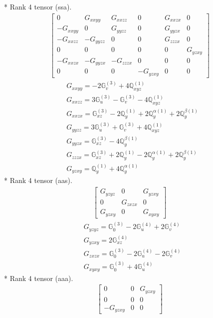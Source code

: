 \documentclass[fleqn,8pt,landscape]{jsarticle}
\begin{document}
* Rank 4 tensor (ssa).
\begin{align*}
\begin{bmatrix} 0 & G_{xxyy} & G_{xxzz} & 0 & G_{xxzx} & 0 \\ - G_{xxyy} & 0 & G_{yyzz} & 0 & G_{yyzx} & 0 \\ - G_{xxzz} & - G_{yyzz} & 0 & 0 & G_{zzzx} & 0 \\ 0 & 0 & 0 & 0 & 0 & G_{yzxy} \\ - G_{xxzx} & - G_{yyzx} & - G_{zzzx} & 0 & 0 & 0 \\ 0 & 0 & 0 & - G_{yzxy} & 0 & 0 \end{bmatrix}
\end{align*}
\begin{align*}
& G_{xxyy} = - 2 \mathbb{G}_{v}^{(3)} + 4 \mathbb{Q}_{xyz}^{(1)} \\
& G_{xxzz} = 3 \mathbb{G}_{u}^{(3)} - \mathbb{G}_{v}^{(3)} - 4 \mathbb{Q}_{xyz}^{(1)} \\
& G_{xxzx} = \mathbb{G}_{xz}^{(3)} - 2 \mathbb{Q}_{y}^{(1)} + 2 \mathbb{Q}_{y}^{\alpha(1)} + 2 \mathbb{Q}_{y}^{\beta(1)} \\
& G_{yyzz} = 3 \mathbb{G}_{u}^{(3)} + \mathbb{G}_{v}^{(3)} + 4 \mathbb{Q}_{xyz}^{(1)} \\
& G_{yyzx} = \mathbb{G}_{xz}^{(3)} - 4 \mathbb{Q}_{y}^{\beta(1)} \\
& G_{zzzx} = \mathbb{G}_{xz}^{(3)} + 2 \mathbb{Q}_{y}^{(1)} - 2 \mathbb{Q}_{y}^{\alpha(1)} + 2 \mathbb{Q}_{y}^{\beta(1)} \\
& G_{yzxy} = \mathbb{Q}_{y}^{(1)} + 4 \mathbb{Q}_{y}^{\alpha(1)}
\end{align*}
* Rank 4 tensor (aas).
\begin{align*}
\begin{bmatrix} G_{yzyz} & 0 & G_{yzxy} \\ 0 & G_{zxzx} & 0 \\ G_{yzxy} & 0 & G_{xyxy} \end{bmatrix}
\end{align*}
\begin{align*}
& G_{yzyz} = \mathbb{G}_{0}^{(3)} - 2 \mathbb{G}_{u}^{(4)} + 2 \mathbb{G}_{v}^{(4)} \\
& G_{yzxy} = 2 \mathbb{G}_{xz}^{(4)} \\
& G_{zxzx} = \mathbb{G}_{0}^{(3)} - 2 \mathbb{G}_{u}^{(4)} - 2 \mathbb{G}_{v}^{(4)} \\
& G_{xyxy} = \mathbb{G}_{0}^{(3)} + 4 \mathbb{G}_{u}^{(4)}
\end{align*}
* Rank 4 tensor (aaa).
\begin{align*}
\begin{bmatrix} 0 & 0 & G_{yzxy} \\ 0 & 0 & 0 \\ - G_{yzxy} & 0 & 0 \end{bmatrix}
\end{align*}
\end{document}
